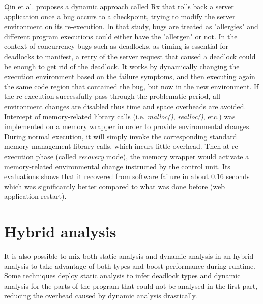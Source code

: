 Qin et al. \cite{rx} proposes a dynamic approach called Rx that rolls back a server application once a bug occurs to a checkpoint,
trying to modify the server environment on its re-execution. In that study, bugs are treated as "allergies" and different program executions
could either have the "allergen" or not. In the context of concurrency bugs such as deadlocks, as timing is essential for deadlocks to manifest,
a retry of the server request that caused a deadlock could be enough to get rid of the deadlock.
It works by dynamically changing the execution environment based on the failure symptoms, and then
executing again the same code region that contained the bug, but now in the new environment.
If the re-execution successfully pass through the problematic period,
all environment changes are disabled thus time and space overheads are avoided.
Intercept of memory-related library calls (i.e. \emph{malloc()}, \emph{realloc()}, etc.) was implemented on a memory wrapper
in order to provide environmental changes. During normal execution, it will simply invoke the corresponding
standard memory management library calls, which incurs little overhead. Then at re-execution phase (called \emph{recovery} mode), the memory wrapper would activate
a memory-related environmental change instructed by the control unit. Its evaluations shows that it recovered from software failure in about 0.16 seconds which was
significantly better compared to what was done before (web application restart).

\section{Hybrid analysis}

It is also possible to mix both static analysis and dynamic analysis in an hybrid analysis to take advantage of both types and boost performance during runtime.
Some techniques deploy static analysis to infer deadlock types and dynamic analysis for the parts of the program that could not be analysed in the first part,
reducing the overhead caused by dynamic analysis drastically.

